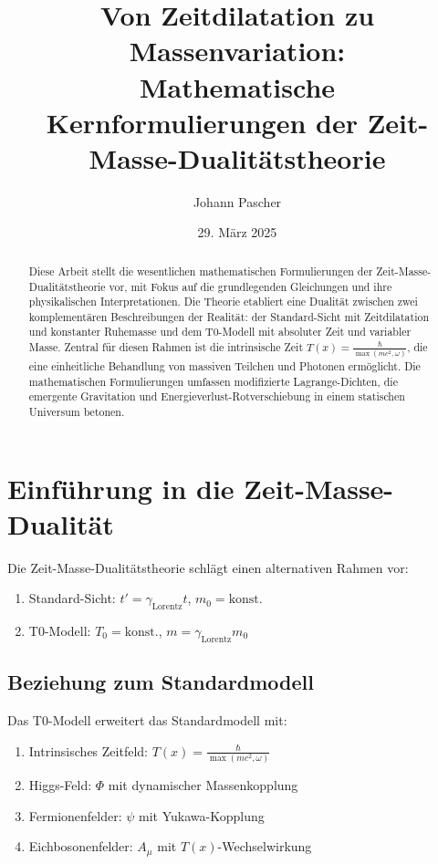 \documentclass[12pt,a4paper]{article}
\title{Von Zeitdilatation zu Massenvariation: \\ Mathematische Kernformulierungen der Zeit-Masse-Dualitätstheorie}
\author{Johann Pascher}
\date{29. März 2025}
\newcommand{\Tfield}{T(x)}
\newcommand{\Tzero}{T_0}
\newcommand{\gammaf}{\gamma_{\text{Lorentz}}}
\theoremstyle{definition}
\theoremstyle{remark}
\begin{document}
	
	\maketitle
	
	\begin{abstract}
		Diese Arbeit stellt die wesentlichen mathematischen Formulierungen der Zeit-Masse-Dualitätstheorie vor, mit Fokus auf die grundlegenden Gleichungen und ihre physikalischen Interpretationen. Die Theorie etabliert eine Dualität zwischen zwei komplementären Beschreibungen der Realität: der Standard-Sicht mit Zeitdilatation und konstanter Ruhemasse und dem T0-Modell mit absoluter Zeit und variabler Masse. Zentral für diesen Rahmen ist die intrinsische Zeit \( \Tfield = \frac{\hbar}{\max(m c^2, \omega)} \), die eine einheitliche Behandlung von massiven Teilchen und Photonen ermöglicht. Die mathematischen Formulierungen umfassen modifizierte Lagrange-Dichten, die emergente Gravitation und Energieverlust-Rotverschiebung in einem statischen Universum betonen.
	\end{abstract}
	
	\tableofcontents
	\newpage
	
	\section{Einführung in die Zeit-Masse-Dualität}
	Die Zeit-Masse-Dualitätstheorie schlägt einen alternativen Rahmen vor:
	\begin{enumerate}
		\item Standard-Sicht: \( t' = \gammaf t \), \( m_0 = \text{konst.} \)
		\item T0-Modell: \( \Tzero = \text{konst.} \), \( m = \gammaf m_0 \)
	\end{enumerate}
	
	\subsection{Beziehung zum Standardmodell}
	Das T0-Modell erweitert das Standardmodell mit:
	\begin{enumerate}
		\item Intrinsisches Zeitfeld: \( \Tfield = \frac{\hbar}{\max(m c^2, \omega)} \)
		\item Higgs-Feld: \( \Phi \) mit dynamischer Massenkopplung
		\item Fermionenfelder: \( \psi \) mit Yukawa-Kopplung
		\item Eichbosonenfelder: \( A_\mu \) mit \( \Tfield \)-Wechselwirkung
	\end{enumerate}
	
\end{document}
